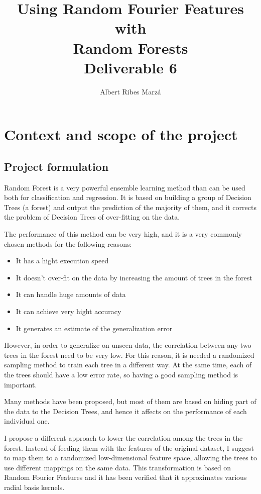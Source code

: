\documentclass[a4paper]{article}
\title{
Using Random Fourier Features with \\ Random Forests \\
\large Deliverable 6}
\author{Albert Ribes Marzá}
\begin{document}
    \maketitle
    \pagebreak

    \tableofcontents
    \pagebreak


    \section{Context and scope of the project}
        \subsection{Project formulation}

        Random Forest is a very powerful ensemble learning method than can be used both for classification and regression. It is based on building a group of Decision Trees (a forest) and output the prediction of the majority of them, and it corrects the problem of Decision Trees of over-fitting on the data\cite{RF}.

        The performance of this method can be very high, and it is a very commonly chosen methods for the following reasons\cite{RF-MIT}:

        \begin{itemize}
            \item It has a hight execution speed
            \item It doesn't over-fit on the data by increasing the amount of trees in the forest
            \item It can handle huge amounts of data
            \item It can achieve very hight accuracy
            \item It generates an estimate of the generalization error
        \end{itemize}

        However, in order to generalize on unseen data, the correlation between any two trees in the forest need to be very low. For this reason, it is needed a randomized sampling method to train each tree in a different way. At the same time, each of the trees should have a low error rate, so having a good sampling method is important.

        Many methods have been proposed, but most of them are based on hiding part of the data to the Decision Trees, and hence it affects on the performance of each individual one.

        I propose a different approach to lower the correlation among the trees in the forest. Instead of feeding them with the features of the original dataset, I suggest to map them to a randomized low-dimensional feature space, allowing the trees to use different mappings on the same data. This transformation is based on Random Fourier Features and it has been verified that it approximates various radial basis kernels\cite{RFF}.
\end{document}
